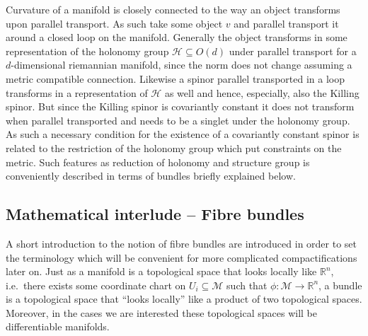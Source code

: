 Curvature of a manifold is closely connected to the way an object transforms upon parallel transport. As such take some object $v$ and parallel transport it around a closed loop on the manifold. Generally the object transforms in some representation of the holonomy group $\mathscr{H}\subseteq O(d)$ under parallel transport for a $d$-dimensional riemannian manifold, since the norm does not change assuming a metric compatible connection. Likewise a spinor parallel transported in a loop transforms in a representation of $\mathscr{H}$ as well and hence, especially, also the Killing spinor. But since the Killing spinor is covariantly constant it does not transform when parallel transported and needs to be a singlet under the holonomy group. As such a necessary condition for the existence of a covariantly constant spinor is related to the restriction of the holonomy group which put constraints on the metric. Such features as reduction of holonomy and structure group is conveniently described in terms of bundles briefly explained below.

\subsection{Mathematical interlude -- Fibre bundles}
A short introduction to the notion of fibre bundles are introduced in order to set the terminology which will be convenient for more complicated compactifications later on. Just as a manifold is a topological space that looks locally like $\mathbb{R}^n$, i.e.\ there exists some coordinate chart on $U_i\subseteq \mathcal{M}$ such that $\phi: \mathcal{M}\to \mathbb{R}^n$, a bundle is a topological space that ``looks locally'' like a product of two topological spaces. Moreover, in the cases we are interested these topological spaces will be differentiable manifolds. 

